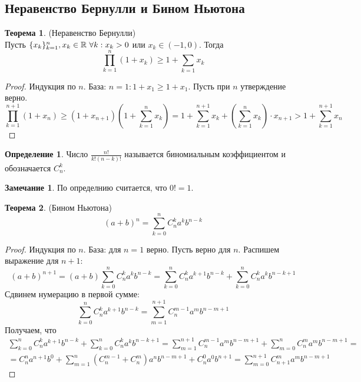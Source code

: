 \documentclass[a4paper, 12pt]{article}
\newcommand{\R}{\mathbb{R}}
\newcommand\tab[1][.5cm]{\hspace*{#1}}
\theoremstyle{definition}
\newtheorem*{definition}{Определение}
\newtheorem*{theorem}{Теорема}
\newtheorem*{comm}{Замечание}
\begin{document}
        \subsection{Неравенство Бернулли и Бином Ньютона}
        \begin{theorem} (Неравенство Бернулли)\\
            Пусть $\{x_k\}_{k=1}^n, x_k\in \R \tab[3pt] \forall k: x_k>0$ или $x_k\in (-1, 0)$. Тогда
            \[\prod\limits_{k=1}^n(1+x_k)\geq 1+\sum\limits_{k=1}x_k\]
        \end{theorem} 
        \begin{proof}
            Индукция по $n$.
            База: $n=1: 1+x_1\geq 1+x_1$.
            Пусть при $n$ утверждение верно.
            \[\prod\limits_{k=1}^{n+1}(1+x_n)\geq(1+x_{n+1})(1+\sum\limits_{k=1}^nx_k)=1+\sum\limits_{k=1}^{n+1}x_k+(\sum\limits_{k=1}^{n}x_k)\cdot x_{n+1}> 1+\sum\limits_{k=1}^{n+1}x_n\]
        \end{proof}
        \begin{definition}
            Число $\frac{n!}{k!(n-k)!}$ называется биномиальным коэффициентом и обозначается $C_n^k$.
        \end{definition} 
        \begin{comm}
            По определнию считается, что $0!=1$.
        \end{comm} 
        \begin{theorem} (Бином Ньютона)
            \[(a+b)^n=\sum\limits_{k=0}^n C_n^k a^k b^{n-k}\]
        \end{theorem} 
        \begin{proof}
            Индукция по $n$. База: для $n=1$ верно. Пусть верно для $n$. Распишем выражение для $n+1$:
            \[(a+b)^{n+1}=(a+b)\sum\limits_{k=0}^n C_n^k a^k b^{n-k}=\sum\limits_{k=0}^n C_n^k a^{k+1} b^{n-k}+\sum\limits_{k=0}^n C_n^k a^k b^{n-k+1}\]
            Сдвинем нумерацию в первой сумме:
            \[\sum\limits_{k=0}^n C_n^k a^{k+1} b^{n-k}=\sum\limits_{m=1}^{n+1} C_n^{m-1} a^{m} b^{n-m+1}\]
            Получаем, что
            \begin{multline*}
            \sum\limits_{k=0}^n C_n^k a^{k+1} b^{n-k}+\sum\limits_{k=0}^n C_n^k a^k b^{n-k+1}=\sum\limits_{m=1}^{n+1} C_n^{m-1} a^{m} b^{n-m+1}+\sum\limits_{m=0}^n C_n^m a^m b^{n-m+1}=\\=C_n^n a^{n+1}b^0+\sum\limits_{m=1}^n(C_n^{m-1}+C_n^m)a^n b^{n-m+1}+C_n^0a^0b^{n+1}=\sum\limits_{m=0}^{n+1}C_{n+1}^m a^m b^{n-m+1}
            \end{multline*}
        \end{proof} 
\end{document}
